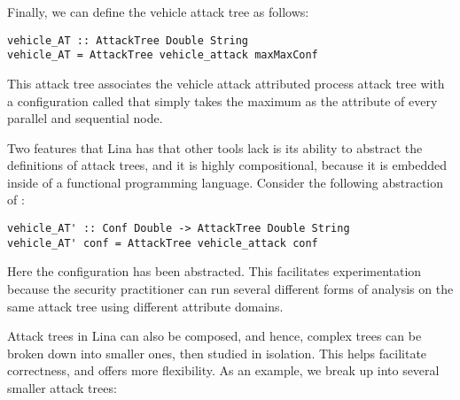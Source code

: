 Finally, we can define the vehicle attack tree as follows:
\begin{verbatim}
vehicle_AT :: AttackTree Double String
vehicle_AT = AttackTree vehicle_attack maxMaxConf
\end{verbatim}
This attack tree associates the vehicle attack attributed process
attack tree with a configuration called  that simply
takes the maximum as the attribute of every parallel and sequential node.

Two features that Lina has that other tools lack is its ability to
abstract the definitions of attack trees, and it is highly
compositional, because it is embedded inside of a functional
programming language.  Consider the following abstraction of
:
\begin{verbatim}
vehicle_AT' :: Conf Double -> AttackTree Double String
vehicle_AT' conf = AttackTree vehicle_attack conf
\end{verbatim}
Here the configuration has been abstracted.  This facilitates
experimentation because the security practitioner can run several
different forms of analysis on the same attack tree using different
attribute domains.

Attack trees in Lina can also be composed, and hence, complex trees
can be broken down into smaller ones, then studied in isolation.  This
helps facilitate correctness, and offers more flexibility.  As an
example, we break up  into several smaller attack
trees:


